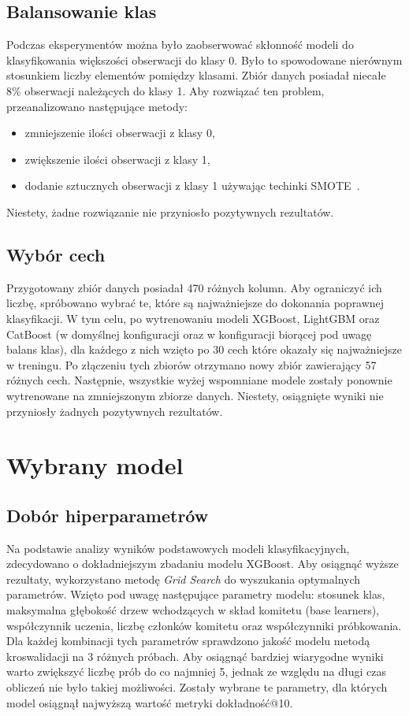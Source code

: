 \documentclass[a4paper,12pt]{article}
\begin{document}
    \subsection{Balansowanie klas}

    Podczas eksperymentów można było zaobserwować skłonność modeli do klasyfikowania większości obserwacji do klasy 0.
    Było to spowodowane nierównym stosunkiem liczby elementów pomiędzy klasami.
    Zbiór danych posiadał niecałe 8\% obserwacji należących do klasy 1.
    Aby rozwiązać ten problem, przeanalizowano następujące metody:
    \begin{itemize}
        \item zmniejszenie ilości obserwacji z klasy 0,
        \item zwiększenie ilości obserwacji z klasy 1,
        \item dodanie sztucznych obserwacji z klasy 1 używając techinki SMOTE~\cite{smote}.
    \end{itemize}
    Niestety, żadne rozwiązanie nie przyniosło pozytywnych rezultatów.

    \subsection{Wybór cech}
    Przygotowany zbiór danych posiadał 470 różnych kolumn.
    Aby ograniczyć ich liczbę, spróbowano wybrać te, które są najważniejsze do dokonania poprawnej klasyfikacji.
    W tym celu, po wytrenowaniu modeli XGBoost, LightGBM oraz CatBoost (w domyślnej konfiguracji oraz w konfiguracji biorącej pod uwagę balans klas), dla każdego z nich wzięto po 30 cech które okazały się najważniejsze w treningu.
    Po złączeniu tych zbiorów otrzymano nowy zbiór zawierający 57 różnych cech.
    Następnie, wszystkie wyżej wspomniane modele zostały ponownie wytrenowane na zmniejszonym zbiorze danych.
    Niestety, osiągnięte wyniki nie przyniosły żadnych pozytywnych rezultatów.

    \section{Wybrany model}

    \subsection{Dobór hiperparametrów}
    Na podstawie analizy wyników podstawowych modeli klasyfikacyjnych, zdecydowano o dokładniejszym zbadaniu modelu XGBoost.
    Aby osiągnąć wyższe rezultaty, wykorzystano metodę \textit{Grid Search} do wyszukania optymalnych parametrów.
    Wzięto pod uwagę następujące parametry modelu: stosunek klas, maksymalna głębokość drzew wchodzących w skład komitetu (base learners), współczynnik uczenia, liczbę członków komitetu oraz współczynniki próbkowania.
    Dla każdej kombinacji tych parametrów sprawdzono jakość modelu metodą kroswalidacji na 3 różnych próbach.
    Aby osiągnąć bardziej wiarygodne wyniki warto zwiększyć liczbę prób do co najmniej 5, jednak ze względu na długi czas obliczeń nie było takiej możliwości.
    Zostały wybrane te parametry, dla których model osiągnął najwyższą wartość metryki dokładność@10.
\end{document}
